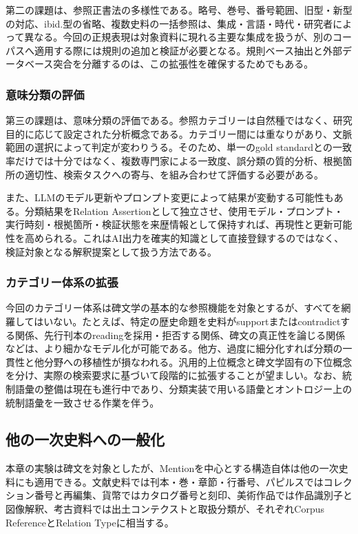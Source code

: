 第二の課題は、参照正書法の多様性である。略号、巻号、番号範囲、旧型・新型の対応、ibid.型の省略、複数史料の一括参照は、集成・言語・時代・研究者によって異なる。今回の正規表現は対象資料に現れる主要な集成を扱うが、別のコーパスへ適用する際には規則の追加と検証が必要となる。規則ベース抽出と外部データベース突合を分離するのは、この拡張性を確保するためでもある。

\subsubsection{意味分類の評価}

第三の課題は、意味分類の評価である。参照カテゴリーは自然種ではなく、研究目的に応じて設定された分析概念である。カテゴリー間には重なりがあり、文脈範囲の選択によって判定が変わりうる。そのため、単一のgold standardとの一致率だけでは十分ではなく、複数専門家による一致度、誤分類の質的分析、根拠箇所の適切性、検索タスクへの寄与、を組み合わせて評価する必要がある。

また、LLMのモデル更新やプロンプト変更によって結果が変動する可能性もある。分類結果をRelation Assertionとして独立させ、使用モデル・プロンプト・実行時刻・根拠箇所・検証状態を来歴情報として保持すれば、再現性と更新可能性を高められる。これはAI出力を確実的知識として直接登録するのではなく、検証対象となる解釈提案として扱う方法である。

\subsubsection{カテゴリー体系の拡張}

今回のカテゴリー体系は碑文学の基本的な参照機能を対象とするが、すべてを網羅してはいない。たとえば、特定の歴史命題を史料がsupportまたはcontradictする関係、先行刊本のreadingを採用・拒否する関係、碑文の真正性を論じる関係などは、より細かなモデル化が可能である。他方、過度に細分化すれば分類の一貫性と他分野への移植性が損なわれる。汎用的上位概念と碑文学固有の下位概念を分け、実際の検索要求に基づいて段階的に拡張することが望ましい。なお、統制語彙の整備は現在も進行中であり、分類実装で用いる語彙とオントロジー上の統制語彙を一致させる作業を伴う。

\subsection{他の一次史料への一般化}

本章の実験は碑文を対象としたが、Mentionを中心とする構造自体は他の一次史料にも適用できる。文献史料では刊本・巻・章節・行番号、パピルスではコレクション番号と再編集、貨幣ではカタログ番号と刻印、美術作品では作品識別子と図像解釈、考古資料では出土コンテクストと取扱分類が、それぞれCorpus ReferenceとRelation Typeに相当する。

